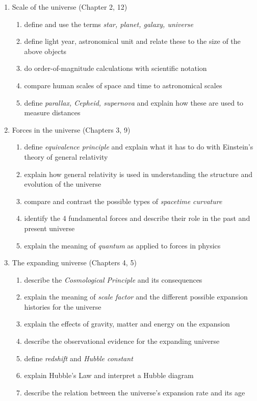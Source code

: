 \documentclass[11pt]{article}
\begin{document}
\begin{enumerate}

\item Scale of the universe (Chapter 2, 12)
\begin{enumerate}
\item define and use the terms {\em star, planet,  galaxy, universe}
\item define light year, astronomical unit and relate these to the size of the above objects
\item do order-of-magnitude calculations with scientific notation 
\item compare human scales of space and time to astronomical scales 
\item define {\em parallax, Cepheid, supernova} and explain how these are used to measure distances 
\end{enumerate}

\item  Forces in the universe (Chapters 3, 9)
\begin{enumerate}
\item define {\em equivalence principle} and explain what it has to do with Einstein's theory of general relativity
\item explain how general relativity is used in understanding the structure and evolution of the universe
\item compare and contrast the possible types of {\em spacetime curvature} 
\item identify the 4 fundamental forces and describe their role in the past and present universe
\item explain the meaning of {\em quantum} as applied to forces in physics
\end{enumerate}

\item The expanding universe (Chapters 4, 5)
\begin{enumerate}
\item describe the {\em Cosmological Principle} and its consequences
\item explain the meaning of {\em scale factor}  and the different possible expansion histories for the universe
\item explain the effects of gravity, matter  and energy on the expansion
\item describe the observational evidence for the expanding universe 
\item define {\em redshift} and {\em Hubble constant}
\item explain Hubble's Law and interpret a Hubble diagram
\item describe the relation between the universe's expansion rate and its age 
\end{enumerate}


\end{enumerate}
\end{document}

